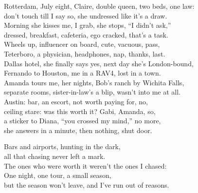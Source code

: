 \begin{lyrics}
Rotterdam, July eight, Claire, double queen, two beds, one law:\\
don’t touch till I say so, she undressed like it’s a draw.\\
Morning she kisses me, I grab, she stops, “I didn’t ask,”\\
dressed, breakfast, cafeteria, ego cracked, that’s a task.\\
Wheels up, influencer on board, cute, vacuous, pass,\\
Teterboro, a physician, headphones, nap, thanks, last.\\
Dallas hotel, she finally says yes, next day she’s London-bound,\\
Fernando to Houston, me in a RAV4, lost in a town.\\
Amanda tours me, her nights, Bob’s ranch by Wichita Falls,\\
separate rooms, sister-in-law’s a blip, wasn’t into me at all.\\
Austin: bar, an escort, not worth paying for, no,\\
ceiling stare: was this worth it? Gabi, Amanda, so,\\
a sticker to Diana, “you crossed my mind,” no more,\\
she answers in a minute, then nothing, shut door.

Bars and airports, hunting in the dark,\\
all that chasing never left a mark.\\
The ones who were worth it weren’t the ones I chased:\\
One night, one tour, a small season,\\
but the season won’t leave, and I’ve run out of reasons.


\end{lyrics}
